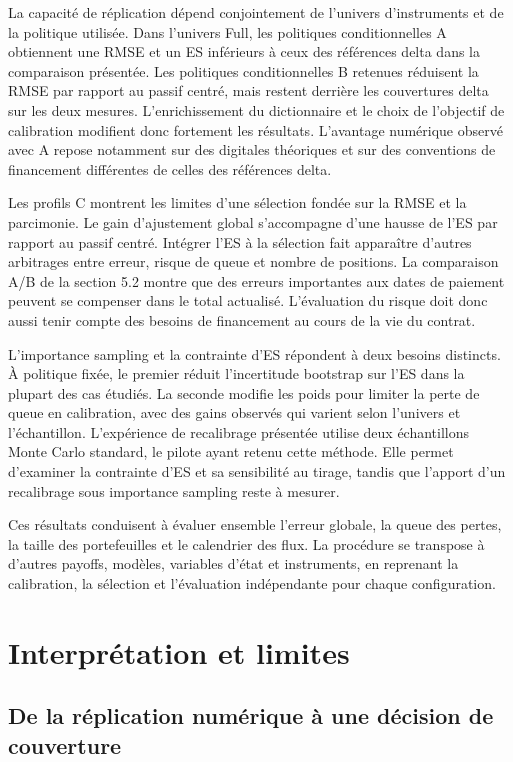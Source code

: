 \documentclass[12pt,a4paper]{article}
\newcommand{\1}{\mathbf{1}}
\begin{document}
La capacité de réplication dépend conjointement de l’univers d’instruments et de la politique utilisée. Dans l’univers Full, les politiques conditionnelles A obtiennent une RMSE et un ES inférieurs à ceux des références delta dans la comparaison présentée. Les politiques conditionnelles B retenues réduisent la RMSE par rapport au passif centré, mais restent derrière les couvertures delta sur les deux mesures. L’enrichissement du dictionnaire et le choix de l’objectif de calibration modifient donc fortement les résultats. L’avantage numérique observé avec A repose notamment sur des digitales théoriques et sur des conventions de financement différentes de celles des références delta.

Les profils C montrent les limites d’une sélection fondée sur la RMSE et la parcimonie. Le gain d’ajustement global s’accompagne d’une hausse de l’ES par rapport au passif centré. Intégrer l’ES à la sélection fait apparaître d’autres arbitrages entre erreur, risque de queue et nombre de positions. La comparaison A/B de la section 5.2 montre que des erreurs importantes aux dates de paiement peuvent se compenser dans le total actualisé. L’évaluation du risque doit donc aussi tenir compte des besoins de financement au cours de la vie du contrat.

L’importance sampling et la contrainte d’ES répondent à deux besoins distincts. À politique fixée, le premier réduit l’incertitude bootstrap sur l’ES dans la plupart des cas étudiés. La seconde modifie les poids pour limiter la perte de queue en calibration, avec des gains observés qui varient selon l’univers et l’échantillon. L’expérience de recalibrage présentée utilise deux échantillons Monte Carlo standard, le pilote ayant retenu cette méthode. Elle permet d’examiner la contrainte d’ES et sa sensibilité au tirage, tandis que l’apport d’un recalibrage sous importance sampling reste à mesurer.

Ces résultats conduisent à évaluer ensemble l’erreur globale, la queue des pertes, la taille des portefeuilles et le calendrier des flux. La procédure se transpose à d’autres payoffs, modèles, variables d’état et instruments, en reprenant la calibration, la sélection et l’évaluation indépendante pour chaque configuration.

\section{Interprétation et limites}

\subsection{De la réplication numérique à une décision de couverture}
\end{document}
